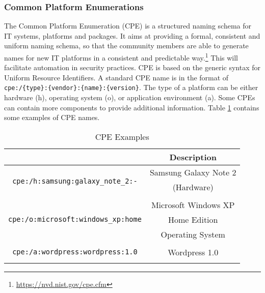 \subsubsection{Common Platform Enumerations}
The Common Platform Enumeration (CPE) is a structured naming schema for IT systems, platforms and packages. It aims at providing a formal, consistent and uniform naming schema, so that the community members are able to generate names for new IT platforms in a consistent and predictable way.\footnote{\url{https://nvd.nist.gov/cpe.cfm}} This will facilitate automation in security practices. CPE is based on the generic syntax for Uniform Resource Identifiers. A standard CPE name is in the format of \texttt{cpe:/\{type\}:\{vendor\}:\{name\}:\{version\}}. The type of a platform can be either hardware (h), operating system (o), or application environment (a). Some CPEs can contain more components to provide additional information. Table \ref{table:sample_cpes} contains some examples of CPE names. 
\begin{table}
\begin{center}
    \begin{tabular}{ | c | c | }
    
    \hline
	 \hhline{|*2-}
     \multicolumn{1}{|c|}{\cellcolor{LightBlue}\textbf{CPE}} &  \multicolumn{1}{|c|}{\cellcolor{LightBlue}\textbf{Description}}  
    \\ \hline
    \multirow{3}{*}{\texttt{cpe:/h:samsung:galaxy\_note\_2:-}} & Samsung Galaxy Note 2 \\ & (Hardware) \\ & 
        \\ \hline
   \multirow{3}{*}{\texttt{cpe:/o:microsoft:windows\_xp:home}} & Microsoft Windows XP \\ & Home Edition \\ & Operating System
        \\ \hline
         \multirow{3}{*}{\texttt{cpe:/a:wordpress:wordpress:1.0}} &  \\ & Wordpress 1.0 \\ & 
        \\ \hline
    \end{tabular}
    \caption{CPE Examples}
    \label{table:sample_cpes}
   \end{center}
    
\end{table}

